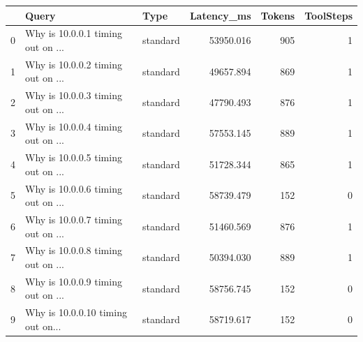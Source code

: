 \begin{tabular}{rllrrr}
\toprule
    & Query                             & Type     &   Latency\_ms &   Tokens &   ToolSteps \\
\midrule
  0 & Why is 10.0.0.1 timing out on ... & standard &    53950.016 &      905 &           1 \\
  1 & Why is 10.0.0.2 timing out on ... & standard &    49657.894 &      869 &           1 \\
  2 & Why is 10.0.0.3 timing out on ... & standard &    47790.493 &      876 &           1 \\
  3 & Why is 10.0.0.4 timing out on ... & standard &    57553.145 &      889 &           1 \\
  4 & Why is 10.0.0.5 timing out on ... & standard &    51728.344 &      865 &           1 \\
  5 & Why is 10.0.0.6 timing out on ... & standard &    58739.479 &      152 &           0 \\
  6 & Why is 10.0.0.7 timing out on ... & standard &    51460.569 &      876 &           1 \\
  7 & Why is 10.0.0.8 timing out on ... & standard &    50394.030 &      889 &           1 \\
  8 & Why is 10.0.0.9 timing out on ... & standard &    58756.745 &      152 &           0 \\
  9 & Why is 10.0.0.10 timing out on... & standard &    58719.617 &      152 &           0 \\
\bottomrule
\end{tabular}